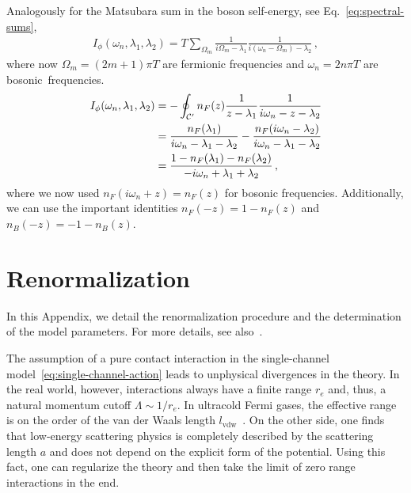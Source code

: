 Analogously for the Matsubara sum in the boson self-energy, see Eq.~\eqref{eq:spectral-sums},
\begin{align}
	I_{\phi}(\omega_n,\lambda_1,\lambda_2)
	= T \sum_{\Omega_m}
	\frac{1}{i\Omega_m-\lambda_1}
    \frac{1}{i(\omega_n-\Omega_m)-\lambda_2} \,,
\end{align}
where now $\Omega_m=(2m+1)\pi T$ are fermionic frequencies and $\omega_n=2n\pi T$
are bosonic~\mbox{frequencies}.
\begin{align}
	I_{\phi}(\omega_n,\lambda_1,\lambda_2)
	&= -\oint_{\mathcal{C}'} n_F(z)
	\frac{1}{z-\lambda_1}
    \frac{1}{i\omega_n-z-\lambda_2} \notag \\
    &= \frac{n_F(\lambda_1)}{i\omega_n-\lambda_1-\lambda_2} -
    \frac{n_F(i\omega_n-\lambda_2)}{i\omega_n-\lambda_1-\lambda_2} \notag \\
    &= \frac{1-n_F(\lambda_1)-n_F(\lambda_2)}{-i\omega_n+\lambda_1+\lambda_2} \,,
\end{align}
where we now used $n_F(i\omega_n+z)=n_F(z)$ for bosonic frequencies. Additionally, we can use the important identities $n_F(-z)=1-n_F(z)$ and $n_B(-z)=-1-n_B(z)$.

\clearpage


\section{Renormalization}
\label{app:renormalization}

In this Appendix, we detail the renormalization procedure and the determination of the model parameters. For more details, see also~\cite{Diehl2006-1,Diehl2008,Punk2010,Schmidt2013}.

The assumption of a pure contact interaction in the single-channel model~\eqref{eq:single-channel-action} leads to unphysical divergences in the theory. In the real world, however, interactions always have a finite range $r_e$ and, thus, a natural momentum cutoff $\Lambda\sim 1/r_e$. In ultracold Fermi gases, the effective range is on the order of the van der Waals length $l_{\mathrm{vdw}}$~\cite{Schmidt2013}. On the other side, one finds that low-energy scattering physics is completely described by the scattering length $a$ and does not depend on the explicit form of the potential. Using this fact, one can regularize the theory and then take the limit of zero range interactions in the end.

